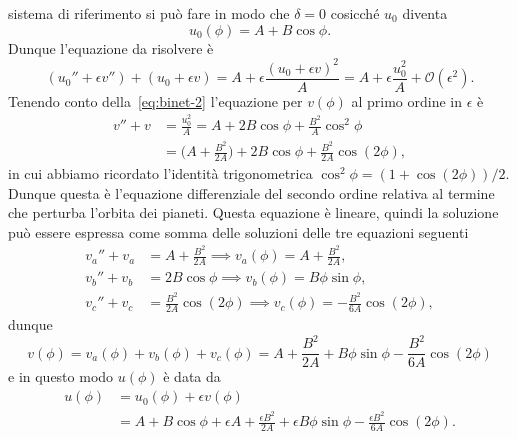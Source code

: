 sistema di riferimento si può fare in modo che $\delta = 0$ cosicché $u_{0}$
diventa
\begin{equation}
  \label{eq:sol-binet}
  u_{0}(\phi) = A + B\cos\phi.
\end{equation}
Dunque l'equazione da risolvere è
\begin{equation}
  (u_{0}'' + \epsilon v'') + (u_{0} + \epsilon v) = A + \epsilon \frac{(u_{0} +
    \epsilon v)^{2}}{A} = A + \epsilon \frac{u_{0}^{2}}{A} +
  \mathcal{O}(\epsilon^{2}).
\end{equation}
Tenendo conto della~\eqref{eq:binet-2} l'equazione per $v(\phi)$ al primo ordine
in $\epsilon$ è
\begin{equation}
  \begin{split}
    v'' + v &= \frac{u_{0}^{2}}{A} = A + 2B\cos\phi +
    \frac{B^{2}}{A}\cos^{2}\phi \\
    &= \bigg(A + \frac{B^{2}}{2A}\bigg) + 2B\cos\phi +
    \frac{B^{2}}{2A}\cos(2\phi),
\end{split}
\end{equation}
in cui abbiamo ricordato l'identità trigonometrica
$\cos^{2}\phi = (1 + \cos(2\phi))/2$.  Dunque questa è l'equazione differenziale
del secondo ordine relativa al termine che perturba l'orbita dei pianeti.
Questa equazione è lineare, quindi la soluzione può essere espressa come somma
delle soluzioni delle tre equazioni seguenti
\begin{subequations}
  \begin{align}
    v_{a}'' + v_{a} &= A + \frac{B^{2}}{2A} \implies v_{a}(\phi) = A +
    \frac{B^{2}}{2A}, \\
    v_{b}'' + v_{b} &= 2B\cos\phi \implies v_{b}(\phi) = B\phi \sin\phi, \\
    v_{c}'' + v_{c} &= \frac{B^{2}}{2A}\cos(2\phi) \implies v_{c}(\phi) =
    -\frac{B^{2}}{6A}\cos(2\phi),
  \end{align}
\end{subequations}
dunque
\begin{equation}
  v(\phi) = v_{a}(\phi) + v_{b}(\phi) + v_{c}(\phi) = A + \frac{B^{2}}{2A} +
  B\phi\sin\phi - \frac{B^{2}}{6A}\cos(2\phi)
\end{equation}
e in questo modo $u(\phi)$ è data da
\begin{equation}
  \begin{split}
    u(\phi) &= u_{0}(\phi) + \epsilon v(\phi) \\
    &= A + B\cos\phi + \epsilon A + \frac{\epsilon B^{2}}{2A} + \epsilon
    B\phi\sin\phi - \frac{\epsilon B^{2}}{6A}\cos(2\phi).
  \end{split}
\end{equation}
